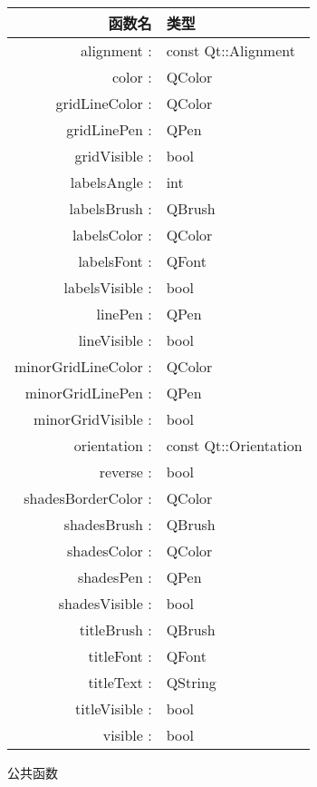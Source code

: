 \begin{tabular}{|r|l|}
\hline
函数名 & 类型 \\
\hline
alignment :&	const Qt::Alignment\\
\hline
color :&	QColor\\
\hline
gridLineColor :&	QColor\\
\hline
gridLinePen :&	QPen\\
\hline
gridVisible :&	bool\\
\hline
labelsAngle :&	int\\
\hline
labelsBrush :&	QBrush\\
\hline
labelsColor :&	QColor\\
\hline
labelsFont :&	QFont\\
\hline
labelsVisible :&	bool\\
\hline
linePen :&	QPen\\
\hline
lineVisible :&	bool\\
\hline
minorGridLineColor :&	QColor\\
\hline
minorGridLinePen :&	QPen\\
\hline
minorGridVisible :&	bool\\
\hline
orientation :&	const Qt::Orientation\\
\hline
reverse :&	bool\\
\hline
shadesBorderColor :&	QColor\\
\hline
shadesBrush :&	QBrush\\
\hline
shadesColor :&	QColor\\
\hline
shadesPen :&	QPen\\
\hline
shadesVisible :&	bool\\
\hline
titleBrush :&	QBrush\\
\hline
titleFont :&	QFont\\
\hline
titleText :&	QString\\
\hline
titleVisible :&	bool\\
\hline
visible :&	bool\\
\hline
\end{tabular}

公共函数


